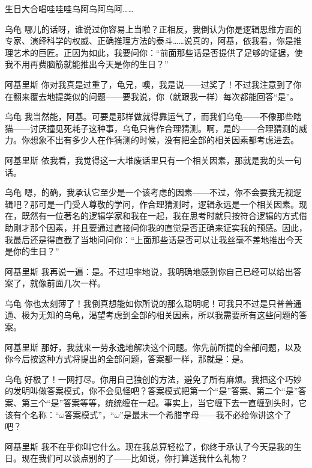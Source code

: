 \begin{dialog}{生日大合唱哇哇哇乌阿乌阿乌阿……}
\begin{dialogue}
\item[乌龟]哪儿的话呀，谁说过你容易上当啦？正相反，我倒认为你是逻辑思维方面的专家、演绎科学的权威、正确推理方法的泰斗……说真的，阿基，依我看，你是推理艺术的巨匠。正因为如此，我要问你：“前面那些话是否提供了足够的证据，使我不用再费脑筋就能推出今天是你的生日？”

\item[阿基里斯]你对我真是过重了，龟兄，噢，我是说——过奖了！不过我注意到了你在翻来覆去地提类似的问题——要我说，你（就跟我一样）每次都能回答“是”。

\item[乌龟]我当然能，阿基。可要是那样做就得靠运气了，而我们乌龟——不像那些瞎猫——讨厌撞见死耗子这种事，乌龟只肯作合理猜测。啊，是的——合理猜测的威力。你想象不出有多少人在作猜测的时候，没有把全部的相关因素都考虑进去。

\item[阿基里斯]依我看，我觉得这一大堆废话里只有一个相关因素，那就是我的头一句话。

\item[乌龟]嗯，的确，我承认它至少是一个该考虑的因素——不过，你不会要我无视逻辑吧？那可是一门受人尊敬的学问，作合理猜测时，逻辑永远是一个相关因素。现在，既然有一位著名的逻辑学家和我在一起，我在思考时就只按符合逻辑的方式借助刚才那个因素，并且要通过直接问你我的直觉是否正确来证实我的预感。因此，我最后还是得直截了当地问问你：“上面那些话是否可以让我丝毫不差地推出今天是你的生日？”

\item[阿基里斯]我再说一遍：是。不过坦率地说，我明确地感到你自己已经可以给出答案了，就像前面几次一样。

\item[乌龟]你也太刻薄了！我倒真想能如你所说的那么聪明呢！可我只不过是只普普通通、极为无知的乌龟，渴望考虑到全部的相关因素，所以我需要所有这些问题的答案。

\item[阿基里斯]那好，我就来一劳永逸地解决这个问题。你先前所提的全部问题，以及你今后按这种方式将提出的全部问题，答案都一样，那就是：是。

\item[乌龟]好极了！一网打尽。你用自己独创的方法，避免了所有麻烦。我把这个巧妙的发明叫做答案模式，你不会见怪吧？答案模式把第一个“是”答案、第二个“是”答案、第三个“是”答案等等，统统缠在一起。事实上，当它缠下去一直缠到头时，它该有个名称：“$\omega$答案模式”，“$\omega$”是最末一个希腊字母——我不必给你讲这个了吧？

\item[阿基里斯]我不在乎你叫它什么。现在我总算轻松了，你终于承认了今天是我的生日。现在我们可以谈点别的了——比如说，你打算送我什么礼物？


\end{dialogue}
\end{dialog}
